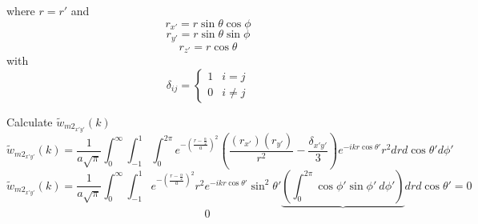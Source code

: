 \documentclass[12pt]{article}
\begin{document}
where $r=r'$ and
\begin{displaymath}{r_{x'}=r\sin\theta\cos\phi}\end{displaymath}
\begin{displaymath}{r_{y'}=r\sin\theta\sin\phi}\end{displaymath}
\begin{displaymath}{r_{z'}=r\cos\theta}\end{displaymath} 
with
\begin{displaymath}{\delta_{ij}=\left\{ \begin{array}{rc} 1 & i = j \\ 0  & i\neq j \end{array}\right.}\end{displaymath}
\[{}\]

Calculate $\widetilde{w}_{{m2}_{x'y'}}(k)$ 
\begin{equation}{\widetilde{w}_{{m2}_{x'y'}}(k)=\frac{1}{a\sqrt{\pi}}\int_{0}^{\infty}\int_{-1}^{1}\int_{0}^{2\pi}e^{-\left(\frac{r-\frac{\alpha}{2}}{a}\right)^2}\left(\frac{(r_{x'})(r_{y'})}{r^2}-\frac{\delta_{x'y'}}{3}\right)e^{-ikr\cos\theta'}r^2d{r}d{\cos\theta'}d{\phi'}}\end{equation}
\begin{equation}{\widetilde{w}_{{m2}_{x'y'}}(k)=\frac{1}{a\sqrt{\pi}}\int_{0}^{\infty}\int_{-1}^{1}e^{-\left(\frac{r-\frac{\alpha}{2}}{a}\right)^2}r^2e^{-ikr\cos\theta'}\sin^2\theta'\underbrace{\left(\int_{0}^{2\pi}\cos\phi'\sin{\phi'}~d{\phi'}\right)}d{r}d{\cos\theta'}=0}\end{equation}
$~~~~~~~~~~~~~~~~~~~~~~~~~~~~~~~~~~~~~~~~~~~~~~~~~~~~~~~~~~~~~~~~~~~~~~~~~~~~~~~~0$
\end{document}
